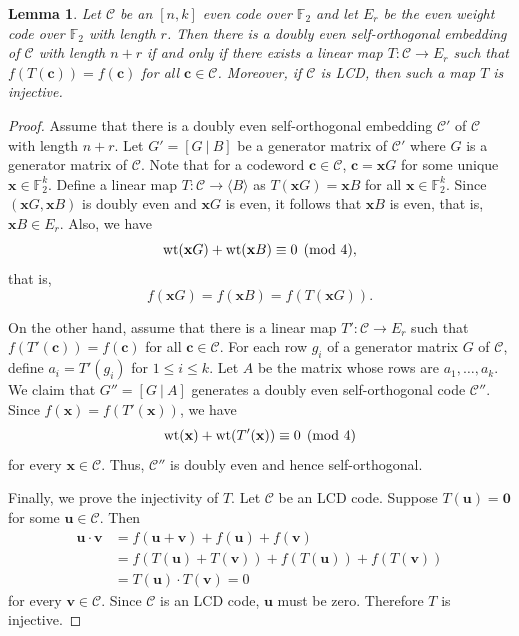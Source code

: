 \documentclass{article}
\newtheorem{lemma}[theorem]{Lemma}
\theoremstyle{definition}
\theoremstyle{remark}
\begin{document}
\begin{lemma}\label{LCDeveniso}
    Let $\mathcal{C}$ be an $[n, k]$ even code over $\mathbb{F}_2$ and let $E_r$ be the even weight code over $\mathbb{F}_2$ with length $r$. Then there is a doubly even self-orthogonal embedding of $\mathcal{C}$ with length $n+r$ if and only if there exists a linear map $T:\mathcal C\to E_r$ such that $f(T(\mathbf c))=f(\mathbf c)$ for all $\mathbf c\in\mathcal C$. Moreover, if $\mathcal{C}$ is LCD, then such a map $T$ is injective.
\end{lemma}
\begin{proof}
    Assume that there is a doubly even self-orthogonal embedding $\mathcal{C}'$ of $\mathcal{C}$ with length $n+r$. Let $G'=[G~|~B]$ be a generator matrix of $\mathcal{C}'$ where $G$ is a generator matrix of $\mathcal{C}$. Note that for a codeword $\mathbf{c}\in\mathcal{C}$, $\mathbf{c}=\mathbf{x}G$ for some unique $\mathbf{x}\in\mathbb{F}_2^{k}$. Define a linear map $T:\mathcal{C}\to \langle B\rangle$ as $T(\mathbf{x}G)=\mathbf{x}B$ for all $\mathbf{x}\in\mathbb{F}_2^{k}$. Since $(\mathbf{x}G, \mathbf{x}B)$ is doubly even and $\mathbf{x}G$ is even, it follows that $\mathbf{x}B$ is even, that is, $\mathbf{x}B\in E_r$. Also, we have
    \[
    {\rm{wt}}(\mathbf{x}G)+{\rm{wt}}(\mathbf{x}B)\equiv 0\pmod 4,
    \]
    that is,
    \[
    f(\mathbf{x}G)=f(\mathbf{x}B)=f(T(\mathbf{x}G)).
    \]

    On the other hand, assume that there is a linear map $T':\mathcal{C}\to E_r$ such that $f(T'(\mathbf c))=f(\mathbf c)$ for all $\mathbf c\in\mathcal C$. For each row $g_i$ of a generator matrix $G$ of $\mathcal{C}$, define $a_i=T'(g_i)$ for $1\le i\le k$. Let $A$ be the matrix whose rows are $a_1, \ldots, a_{k}$. We claim that $G''=[G~|~A]$ generates a doubly even self-orthogonal code $\mathcal{C}''$. Since $f(\mathbf{x})=f(T'(\mathbf{x}))$, we have
    \[
    {\rm{wt}}(\mathbf{x})+{\rm{wt}}(T'(\mathbf{x}))\equiv 0\pmod 4
    \]
    for every $\mathbf{x}\in\mathcal{C}$. Thus, $\mathcal{C}''$ is doubly even and hence self-orthogonal.    

    Finally, we prove the injectivity of $T$. Let $\mathcal{C}$ be an LCD code. Suppose $T(\mathbf{u})=\mathbf{0}$ for some $\mathbf{u}\in\mathcal{C}$. Then
    \begin{align*}
    \mathbf{u}\cdot\mathbf{v}&=f(\mathbf{u}+\mathbf{v})+f(\mathbf{u})+f(\mathbf{v})\\
    &=f(T(\mathbf{u})+T(\mathbf{v}))+f(T(\mathbf{u}))+f(T(\mathbf{v}))\\
    &=T(\mathbf{u})\cdot T(\mathbf{v})=0
    \end{align*}
    for every $\mathbf{v}\in\mathcal{C}$. Since $\mathcal{C}$ is an LCD code, $\mathbf{u}$ must be zero. Therefore $T$ is injective.
\end{proof}
\end{document}
